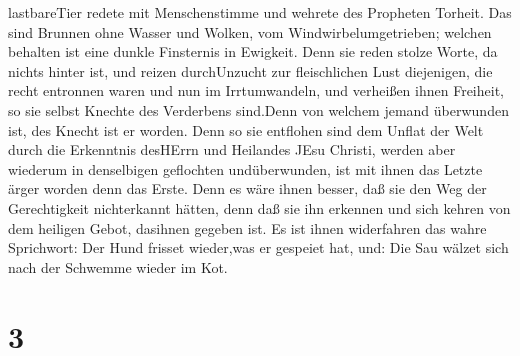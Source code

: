 lastbareTier redete mit Menschenstimme und wehrete des Propheten
Torheit.  Das sind Brunnen ohne Wasser und Wolken, vom
Windwirbelumgetrieben; welchen behalten ist eine dunkle Finsternis in
Ewigkeit.  Denn sie reden stolze Worte, da nichts hinter
ist, und reizen durchUnzucht zur fleischlichen Lust diejenigen, die
recht entronnen waren und nun im Irrtumwandeln,  und
verheißen ihnen Freiheit, so sie selbst Knechte des Verderbens sind.Denn
von welchem jemand überwunden ist, des Knecht ist er worden.
 Denn so sie entflohen sind dem Unflat der Welt durch die
Erkenntnis desHErrn und Heilandes JEsu Christi, werden aber wiederum in
denselbigen geflochten undüberwunden, ist mit ihnen das Letzte ärger
worden denn das Erste.  Denn es wäre ihnen besser, daß sie
den Weg der Gerechtigkeit nichterkannt hätten, denn daß sie ihn erkennen
und sich kehren von dem heiligen Gebot, dasihnen gegeben ist.
 Es ist ihnen widerfahren das wahre Sprichwort: Der Hund
frisset wieder,was er gespeiet hat, und: Die Sau wälzet sich nach der
Schwemme wieder im Kot.

\hypertarget{section-2}{%
\section{3}\label{section-2}}


